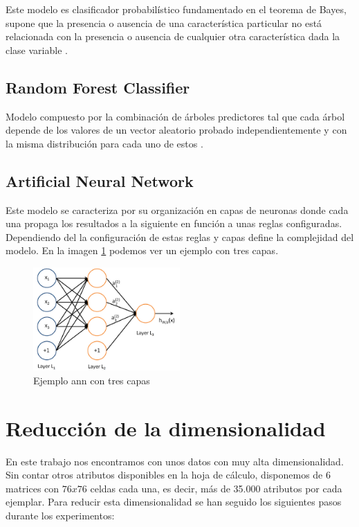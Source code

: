 Este modelo es clasificador probabilístico fundamentado en el teorema de Bayes,  supone que la presencia o ausencia de una característica particular no está relacionada con la presencia o ausencia de cualquier otra característica dada la clase variable \cite{de:NaiveClassifier}. 

\subsection{Random Forest Classifier}
Modelo compuesto por la combinación de árboles predictores tal que cada árbol depende de los valores de un vector aleatorio probado independientemente y con la misma distribución para cada uno de estos \cite{Breiman2001RandomForests}. 

\subsection{Artificial Neural Network}
Este modelo se caracteriza por su organización en capas de neuronas donde cada una
propaga los resultados a la siguiente en función a unas reglas configuradas. Dependiendo del la configuración de estas reglas y capas define la complejidad del modelo. En la imagen \ref{figure:ann} podemos ver un ejemplo con tres capas.

\begin{figure}[H]
\centering
\includegraphics[width=0.5\textwidth]{figs/algorimos/ann.png}
\caption{Ejemplo \gls{ann} con tres capas}
\label{figure:ann}
\end{figure}

\section{Reducción de la dimensionalidad}

En este trabajo nos encontramos con unos datos con muy alta dimensionalidad. Sin contar otros atributos disponibles en la hoja de cálculo, disponemos de 6 matrices con $76x76$ celdas cada una, es decir, más de 35.000 atributos por cada ejemplar. Para reducir esta dimensionalidad se han seguido los siguientes pasos durante los experimentos:

